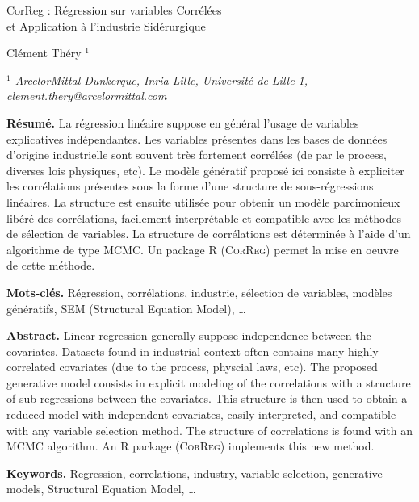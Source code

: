 \documentclass[12pt]{article}
\begin{document}
     \def\Var{{\rm Var}\,}


\begin{center}
{\Large
	{\sc  CorReg : Régression sur variables Corrélées\\ et Application à l'industrie Sidérurgique}
}
\bigskip

 Clément Théry $^{1}$
\bigskip

{\it
$^{1}$ ArcelorMittal Dunkerque, Inria Lille, Université de Lille 1, clement.thery@arcelormittal.com
 
}
\end{center}
\bigskip


{\bf Résumé.} La régression linéaire suppose en général l'usage de variables explicatives indépendantes. Les variables présentes dans les bases de données d'origine industrielle sont souvent très fortement corrélées (de par le process, diverses lois physiques, etc). Le modèle génératif proposé ici consiste à expliciter les corrélations présentes sous la forme d'une structure de sous-régressions linéaires. La structure est ensuite utilisée pour obtenir un modèle parcimonieux libéré des corrélations, facilement interprétable et compatible avec les méthodes de sélection de variables. La structure de corrélations est déterminée à l'aide d'un algorithme de type MCMC. Un package R (\textsc{CorReg}) permet la mise en oeuvre de cette méthode. 
\smallskip

{\bf Mots-clés.} Régression, corrélations, industrie, sélection de variables, modèles génératifs, SEM (Structural Equation Model), \ldots
\bigskip\bigskip

{\bf Abstract.} Linear regression generally suppose independence between the covariates. Datasets found in industrial context often contains many highly correlated covariates (due to the process, physcial laws, etc). The proposed generative model consists in explicit modeling of the correlations with a structure of sub-regressions between the covariates. This structure is then used to obtain a reduced model with independent covariates, easily interpreted, and compatible with any variable selection method. The structure of correlations is found with an MCMC algorithm. An R package (\textsc{CorReg}) implements this new method.  
\smallskip

{\bf Keywords.} Regression, correlations, industry, variable selection, generative models, Structural Equation Model, \ldots
\end{document}
